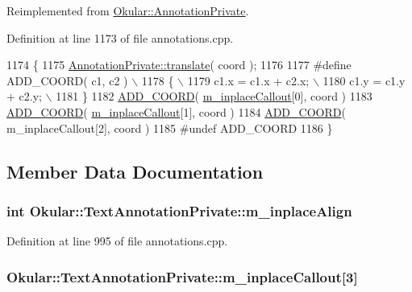 Reimplemented from \hyperlink{classOkular_1_1AnnotationPrivate_aee9684802697da01c33c4dec9de56ee1}{Okular\+::\+Annotation\+Private}.



Definition at line 1173 of file annotations.\+cpp.


\begin{DoxyCode}
1174 \{
1175     \hyperlink{classOkular_1_1AnnotationPrivate_aee9684802697da01c33c4dec9de56ee1}{AnnotationPrivate::translate}( coord );
1176 
1177 \textcolor{preprocessor}{#define ADD\_COORD( c1, c2 ) \(\backslash\)}
1178 \textcolor{preprocessor}{\{ \(\backslash\)}
1179 \textcolor{preprocessor}{  c1.x = c1.x + c2.x; \(\backslash\)}
1180 \textcolor{preprocessor}{  c1.y = c1.y + c2.y; \(\backslash\)}
1181 \textcolor{preprocessor}{\}}
1182     \hyperlink{annotations_8cpp_a0fb96847794c3e9690710429246d20fa}{ADD\_COORD}( \hyperlink{classOkular_1_1TextAnnotationPrivate_a78038b3c94f975a41c4f30acd5ed6032}{m\_inplaceCallout}[0], coord )
1183     \hyperlink{annotations_8cpp_a0fb96847794c3e9690710429246d20fa}{ADD\_COORD}( \hyperlink{classOkular_1_1TextAnnotationPrivate_a78038b3c94f975a41c4f30acd5ed6032}{m\_inplaceCallout}[1], coord )
1184     \hyperlink{annotations_8cpp_a0fb96847794c3e9690710429246d20fa}{ADD\_COORD}( m\_inplaceCallout[2], coord )
1185 \textcolor{preprocessor}{#undef ADD\_COORD}
1186 \}
\end{DoxyCode}


\subsection{Member Data Documentation}
\hypertarget{classOkular_1_1TextAnnotationPrivate_ab61fd57ec0bf98230cabd0d508cec3d4}{
\subsubsection[{m\+\_\+inplace\+Align}]{\setlength{\rightskip}{0pt plus 5cm}int Okular\+::\+Text\+Annotation\+Private\+::m\+\_\+inplace\+Align}}\label{classOkular_1_1TextAnnotationPrivate_ab61fd57ec0bf98230cabd0d508cec3d4}


Definition at line 995 of file annotations.\+cpp.

\hypertarget{classOkular_1_1TextAnnotationPrivate_a78038b3c94f975a41c4f30acd5ed6032}{
\subsubsection[{m\+\_\+inplace\+Callout}]{ Okular\+::\+Text\+Annotation\+Private\+::m\+\_\+inplace\+Callout\mbox{[}3\mbox{]}}}\label{classOkular_1_1TextAnnotationPrivate_a78038b3c94f975a41c4f30acd5ed6032}


